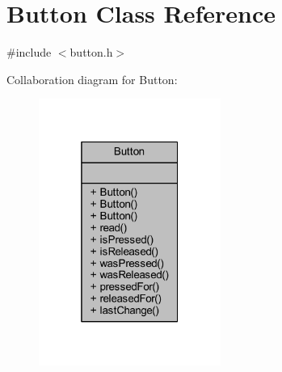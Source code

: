 \hypertarget{class_button}{}\section{Button Class Reference}
\label{class_button}


{\ttfamily \#include $<$button.\+h$>$}



Collaboration diagram for Button\+:
\nopagebreak
\begin{figure}[H]
\begin{center}
\leavevmode
\includegraphics[width=169pt]{db/d33/class_button__coll__graph}
\end{center}
\end{figure}
